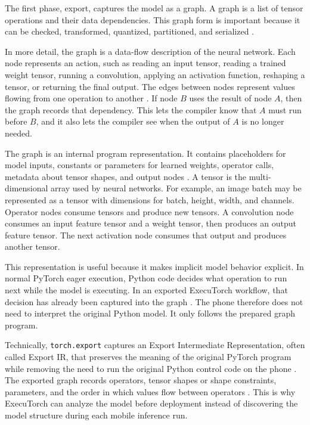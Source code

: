 The first phase, export, captures the model as a graph. A graph is a list of
tensor operations and their data dependencies. This graph form is important because it can be
checked, transformed, quantized, partitioned, and serialized
\cite{pytorch_export,executorch_export}.

In more detail, the graph is a data-flow description of the neural network.
Each node represents an action, such as reading an input
tensor, reading a trained weight tensor, running a convolution, applying an
activation function, reshaping a tensor, or returning the final output. The
edges between nodes represent values flowing from one operation to another
\cite{pytorch_export}. If node \(B\) uses the result of node \(A\), then the
graph records that dependency. This lets the compiler know that \(A\) must run
before \(B\), and it also lets the compiler see when the output of \(A\) is no
longer needed.

The graph is an internal
program representation. It contains placeholders for model inputs, constants
or parameters for learned weights, operator calls, metadata about tensor shapes,
and output nodes \cite{pytorch_export,executorch_how}. A tensor is the
multi-dimensional array used by neural networks. For example, an image batch
may be represented as a tensor with dimensions for batch, height, width, and
channels. Operator nodes consume tensors and produce new tensors. A convolution
node consumes an input feature tensor and a weight tensor, then produces an
output feature tensor. The next activation node consumes that output and
produces another tensor.

This representation is useful because it makes implicit model behavior
explicit. In normal PyTorch eager execution, Python code decides what operation
to run next while the model is executing. In an exported ExecuTorch workflow,
that decision has already been captured into the graph \cite{executorch_how}.
The phone therefore does not need to interpret the original Python model. It
only follows the prepared graph program.

Technically, \texttt{torch.export} captures an Export Intermediate
Representation, often called Export IR, that preserves the meaning of the
original PyTorch program while removing the need to run the original Python
control code on the phone \cite{pytorch_export,executorch_how}. The exported
graph records operators, tensor shapes or shape constraints, parameters, and
the order in which values flow between operators \cite{pytorch_export}. This is
why ExecuTorch can analyze the model before deployment instead of discovering
the model structure during each mobile inference run.


